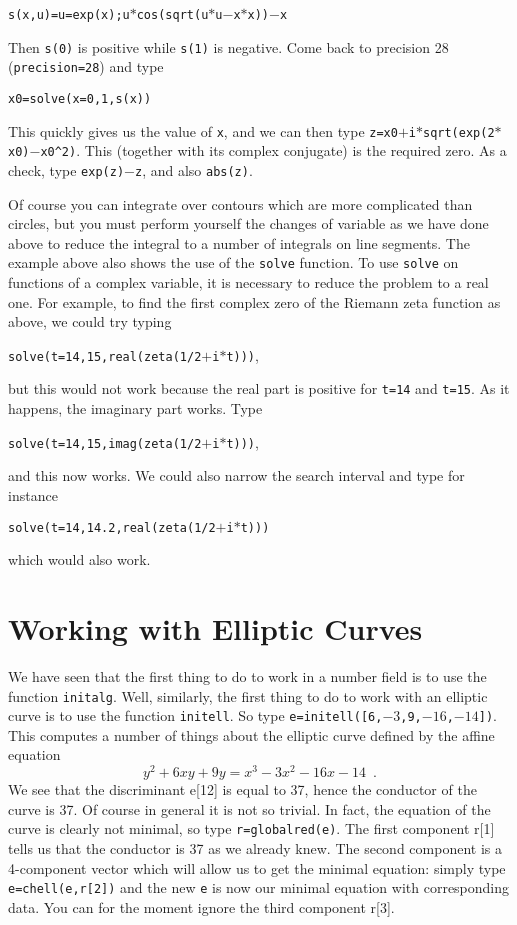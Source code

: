 \centerline{\tt s(x,u)=u=exp(x);u$*$cos(sqrt(u$*$u$-$x$*$x))$-$x}

Then {\tt s(0)} is positive while {\tt s(1)} is negative. Come back to
precision 28 ({\tt\bs precision=28}) and type

\centerline{\tt x0=solve(x=0,1,s(x))}

This quickly gives us the value of {\tt x}, and we can then type
{\tt z=x0$+$i$*$sqrt(exp(2$*$x0)$-$x0\^{}2)}. This (together with its complex
conjugate) is the required zero. As a check, type {\tt exp(z)$-$z}, and also
{\tt abs(z)}.

Of course you can integrate over contours which are more complicated than
circles, but you must perform yourself the changes of variable as we have
done above to reduce the integral to a number of integrals on line segments.
\smallskip
The example above also shows the use of the {\tt solve} function. To use
{\tt solve} on functions of a complex variable, it is necessary to reduce
the problem to a real one. For example, to find the first complex zero
of the Riemann zeta function as above, we could try typing

{\tt solve(t=14,15,real(zeta(1/2$+$i$*$t)))},

but this would not work because
the real part is positive for {\tt t=14} and {\tt t=15}. As it happens, the
imaginary part works. Type 

{\tt solve(t=14,15,imag(zeta(1/2$+$i$*$t)))},

and this now works. We could also narrow the search interval and type for
instance 

{\tt solve(t=14,14.2,real(zeta(1/2$+$i$*$t)))} 

which would also work.
\medskip
\section{Working with Elliptic Curves}
\medskip
We have seen that the first thing to do to work in a number field is to use
the function {\tt initalg}. Well, similarly, the first thing to do to work
with an elliptic curve is to use the function {\tt initell}. So type
{\tt e=initell([6,$-3$,9,$-16$,$-14$])}. This computes a number of things
about the elliptic curve defined by the affine equation
$$y^2+6xy+9y=x^3-3x^2-16x-14\enspace.$$ We see that the discriminant
e[12] is equal to 37, hence the conductor of the curve is 37. Of course in 
general it is not so trivial. In fact, the equation of the curve is clearly
not minimal, so type {\tt r=globalred(e)}. The first component r[1] tells
us that the conductor is 37 as we already knew. The second component is a
4-component vector which will allow us to get the minimal equation:
simply type {\tt e=chell(e,r[2])} and the new {\tt e} is now our minimal
equation with corresponding data. You can for the moment ignore the third
component r[3].

